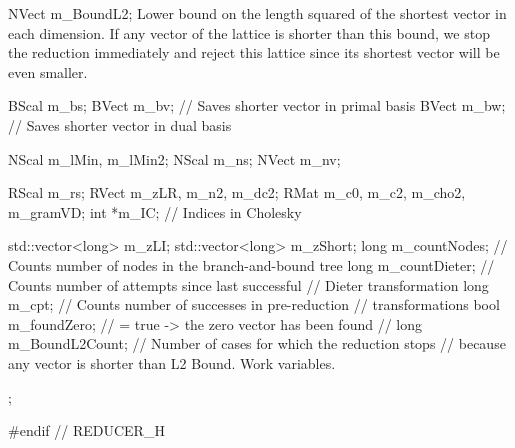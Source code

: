 {{   NVect m_BoundL2;
\endcode
\tabb  
 Lower bound on the length squared of the shortest vector in each dimension.
 If any vector of the lattice is shorter than this bound, we stop the reduction
immediately and reject this lattice since its shortest vector will be
even smaller.
\endtabb
\code

   BScal m_bs;
   BVect m_bv;            // Saves shorter vector in primal basis
   BVect m_bw;            // Saves shorter vector in dual basis

   NScal m_lMin, m_lMin2;
   NScal m_ns;
   NVect m_nv; 

   RScal m_rs;
   RVect m_zLR, m_n2, m_dc2;
   RMat m_c0, m_c2, m_cho2, m_gramVD;
   int *m_IC;             // Indices in Cholesky 
   
   std::vector<long> m_zLI;
   std::vector<long> m_zShort;
   long m_countNodes;     // Counts number of nodes in the branch-and-bound tree
   long m_countDieter;    // Counts number of attempts since last successful
                          // Dieter transformation
   long m_cpt;            // Counts number of successes in pre-reduction
                          // transformations
   bool m_foundZero;      // = true -> the zero vector has been found
// long m_BoundL2Count;   // Number of cases for which the reduction stops
                          // because any vector is shorter than L2 Bound.
\endcode
\tabb
  Work variables.
\endtabb
\fi
\code
};

}

\hide
#endif // REDUCER_H
\endhide
\endcode
